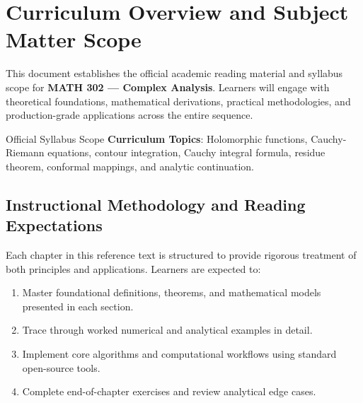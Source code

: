 \section{Curriculum Overview and Subject Matter Scope}

This document establishes the official academic reading material and syllabus scope for \textbf{MATH 302 --- Complex Analysis}. Learners will engage with theoretical foundations, mathematical derivations, practical methodologies, and production-grade applications across the entire sequence.

\begin{InsightBox}{Official Syllabus Scope}
  \textbf{Curriculum Topics}: Holomorphic functions, Cauchy-Riemann equations, contour integration, Cauchy integral formula, residue theorem, conformal mappings, and analytic continuation.
\end{InsightBox}

\subsection{Instructional Methodology and Reading Expectations}

Each chapter in this reference text is structured to provide rigorous treatment of both principles and applications. Learners are expected to:
\begin{enumerate}
  \item Master foundational definitions, theorems, and mathematical models presented in each section.
  \item Trace through worked numerical and analytical examples in detail.
  \item Implement core algorithms and computational workflows using standard open-source tools.
  \item Complete end-of-chapter exercises and review analytical edge cases.
\end{enumerate}

